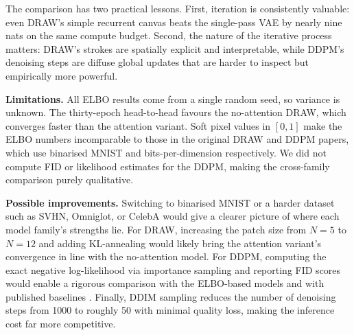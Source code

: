 \documentclass{article}
\begin{document}
The comparison has two practical lessons. First, iteration is consistently
valuable: even DRAW's simple recurrent canvas beats the single-pass VAE by
nearly nine nats on the same compute budget. Second, the nature of the iterative
process matters: DRAW's strokes are spatially explicit and interpretable, while
DDPM's denoising steps are diffuse global updates that are harder to inspect
but empirically more powerful.

\textbf{Limitations.}
All ELBO results come from a single random seed, so variance is unknown. The
thirty-epoch head-to-head favours the no-attention DRAW, which converges faster
than the attention variant. Soft pixel values in \([0,1]\) make the ELBO numbers
incomparable to those in the original DRAW and DDPM papers, which use binarised
MNIST and bits-per-dimension respectively. We did not compute FID or likelihood
estimates for the DDPM, making the cross-family comparison purely qualitative.

\textbf{Possible improvements.}
Switching to binarised MNIST or a harder dataset such as SVHN, Omniglot, or
CelebA would give a clearer picture of where each model family's strengths lie.
For DRAW, increasing the patch size from \(N=5\) to \(N=12\) and adding
KL-annealing would likely bring the attention variant's convergence in line with
the no-attention model. For DDPM, computing the exact negative log-likelihood
via importance sampling and reporting FID scores would enable a rigorous
comparison with the ELBO-based models and with published baselines
\citep{ho2020ddpm,nichol2021improved}. Finally, DDIM sampling
\citep{nichol2021improved} reduces the number of denoising steps from 1000 to
roughly 50 with minimal quality loss, making the inference cost far more
competitive.



\end{document}
